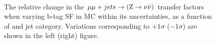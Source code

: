 \begin{figure}[!h]
  \centering
   ~~
  \\

  \caption{\label{fig:tfSyst_bsf_mumuToZinv} The relative change in
  the $\mu\mu + jets \rightarrow ({\text Z} \rightarrow \nu\bar{\nu})$ transfer
  factors when varying b-tag SF in MC within its uncertainties, as a function of \scalht and jet category. 
  Variations corresponding to $+1\sigma$ ($-1\sigma$) are shown in the left (right) figure. 
  }
\end{figure}


